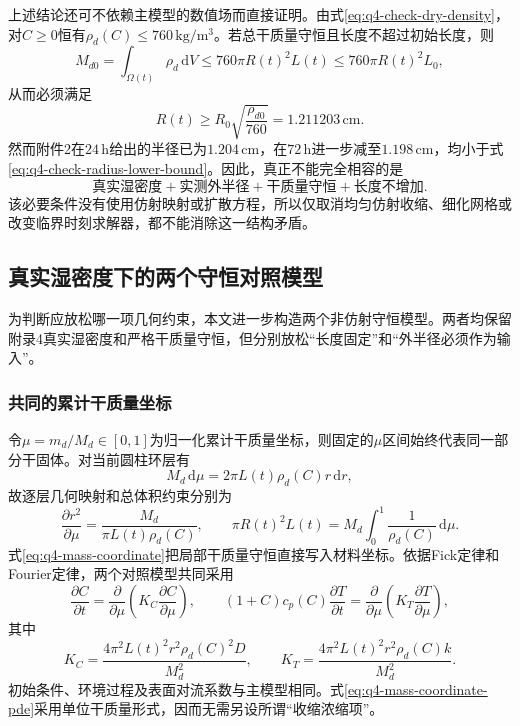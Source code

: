 \documentclass[withoutpreface,bwprint]{cumcmthesis}
\begin{document}
上述结论还可不依赖主模型的数值场而直接证明。由式\eqref{eq:q4-check-dry-density}，对$C\ge0$恒有$\rho_d(C)\le760\,\mathrm{kg/m^3}$。若总干质量守恒且长度不超过初始长度，则
\begin{equation}
M_{d0}=\int_{\Omega(t)}\rho_d\,\mathrm dV
\le760\pi R(t)^2L(t)
\le760\pi R(t)^2L_0,
\end{equation}
从而必须满足
\begin{equation}
\boxed{
R(t)\ge R_0\sqrt{\frac{\rho_{d0}}{760}}
=1.211203\,\mathrm{cm}.
}
\label{eq:q4-check-radius-lower-bound}
\end{equation}
然而附件2在$24\,\mathrm h$给出的半径已为$1.204\,\mathrm{cm}$，在$72\,\mathrm h$进一步减至$1.198\,\mathrm{cm}$，均小于式\eqref{eq:q4-check-radius-lower-bound}。因此，真正不能完全相容的是
\[
\boxed{\text{真实湿密度}+\text{实测外半径}+\text{干质量守恒}+\text{长度不增加}}.
\]
该必要条件没有使用仿射映射或扩散方程，所以仅取消均匀仿射收缩、细化网格或改变临界时刻求解器，都不能消除这一结构矛盾。

\subsection{真实湿密度下的两个守恒对照模型}

为判断应放松哪一项几何约束，本文进一步构造两个非仿射守恒模型。两者均保留附录4真实湿密度和严格干质量守恒，但分别放松“长度固定”和“外半径必须作为输入”。

\subsubsection{共同的累计干质量坐标}

令$\mu=m_d/M_d\in[0,1]$为归一化累计干质量坐标，则固定的$\mu$区间始终代表同一部分干固体。对当前圆柱环层有
\begin{equation}
M_d\,\mathrm d\mu
=2\pi L(t)\rho_d(C)r\,\mathrm dr,
\label{eq:q4-mass-coordinate}
\end{equation}
故逐层几何映射和总体积约束分别为
\begin{equation}
\frac{\partial r^2}{\partial\mu}
=\frac{M_d}{\pi L(t)\rho_d(C)},
\qquad
\pi R(t)^2L(t)
=M_d\int_0^1\frac{1}{\rho_d(C)}\,\mathrm d\mu.
\label{eq:q4-common-geometry}
\end{equation}
式\eqref{eq:q4-mass-coordinate}把局部干质量守恒直接写入材料坐标。依据Fick定律和Fourier定律\cite{fick1855,crank1975,bird2002}，两个对照模型共同采用
\begin{equation}
\frac{\partial C}{\partial t}
=\frac{\partial}{\partial\mu}
\left(K_C\frac{\partial C}{\partial\mu}\right),
\qquad
(1+C)c_p(C)\frac{\partial T}{\partial t}
=\frac{\partial}{\partial\mu}
\left(K_T\frac{\partial T}{\partial\mu}\right),
\label{eq:q4-mass-coordinate-pde}
\end{equation}
其中
\begin{equation}
K_C=\frac{4\pi^2L(t)^2r^2\rho_d(C)^2D}{M_d^2},
\qquad
K_T=\frac{4\pi^2L(t)^2r^2\rho_d(C)k}{M_d^2}.
\label{eq:q4-mass-coordinate-coefficients}
\end{equation}
初始条件、环境过程及表面对流系数与主模型相同。式\eqref{eq:q4-mass-coordinate-pde}采用单位干质量形式，因而无需另设所谓“收缩浓缩项”。
\end{document}

